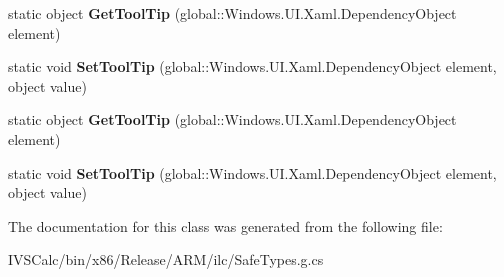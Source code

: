 \begin{DoxyCompactItemize}
\mbox{\label{class_windows_1_1_u_i_1_1_xaml_1_1_controls_1_1_tool_tip_service_a9fa61fd3c9c52ae20e7cdd1644808cda}} 
static object {\bfseries Get\+Tool\+Tip} (global\+::\+Windows.\+U\+I.\+Xaml.\+Dependency\+Object element)
\item 
\mbox{\label{class_windows_1_1_u_i_1_1_xaml_1_1_controls_1_1_tool_tip_service_aae99b83ec3154c4c13b20b265449b018}} 
static void {\bfseries Set\+Tool\+Tip} (global\+::\+Windows.\+U\+I.\+Xaml.\+Dependency\+Object element, object value)
\item 
\mbox{\label{class_windows_1_1_u_i_1_1_xaml_1_1_controls_1_1_tool_tip_service_a9fa61fd3c9c52ae20e7cdd1644808cda}} 
static object {\bfseries Get\+Tool\+Tip} (global\+::\+Windows.\+U\+I.\+Xaml.\+Dependency\+Object element)
\item 
\mbox{\label{class_windows_1_1_u_i_1_1_xaml_1_1_controls_1_1_tool_tip_service_aae99b83ec3154c4c13b20b265449b018}} 
static void {\bfseries Set\+Tool\+Tip} (global\+::\+Windows.\+U\+I.\+Xaml.\+Dependency\+Object element, object value)
\end{DoxyCompactItemize}


The documentation for this class was generated from the following file\+:\begin{DoxyCompactItemize}
\item 
I\+V\+S\+Calc/bin/x86/\+Release/\+A\+R\+M/ilc/Safe\+Types.\+g.\+cs\end{DoxyCompactItemize}
